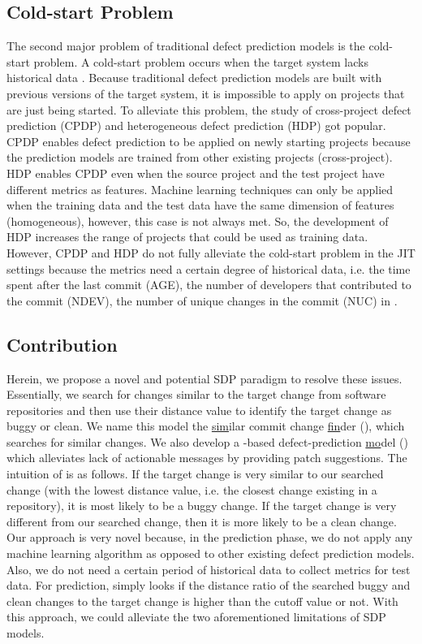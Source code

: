 \subsection{Cold-start Problem}
The second major problem of traditional defect prediction models is the cold-start problem.
A cold-start problem occurs when the target system lacks historical data \cite{schein2002methods}. 
Because traditional defect prediction models are built with previous versions of the target system, it is impossible to apply on projects that are just being started.
To alleviate this problem, the study of cross-project defect prediction (CPDP) and heterogeneous defect prediction (HDP) got popular.
CPDP enables defect prediction to be applied on newly starting projects because the prediction models are trained from other existing projects (cross-project).
HDP enables CPDP even when the source project and the test project have different metrics as features.
Machine learning techniques can only be applied when the training data and the test data have the same dimension of features (homogeneous), however, this case is not always met.
So, the development of HDP increases the range of projects that could be used as training data.
However, CPDP and HDP do not fully alleviate the cold-start problem in the JIT settings because the metrics need a certain degree of historical data, i.e. the time spent after the last commit (AGE), the number of developers that contributed to the commit (NDEV), the number of unique changes in the commit (NUC) in \cite{kamei2012large}.

\subsection{Contribution}
Herein, we propose a novel and potential SDP paradigm to resolve these issues.
Essentially, we search for changes similar to the target change from software repositories and then use their distance value to identify the target change as buggy or clean.
We name this model the \underline{sim}ilar commit change \underline{fin}der ({\simfin}), which searches for similar changes.
We also develop a \underline{\simfin}-based defect-prediction \underline{mo}del ({\simfinmo}) which alleviates lack of actionable messages by providing patch suggestions.
The intuition of {\simfin} is as follows.
If the target change is very similar to our searched change (with the lowest distance value, i.e. the closest change existing in a repository), it is most likely to be a buggy change.
If the target change is very different from our searched change, then it is more likely to be a clean change.
Our approach is very novel because, in the prediction phase, we do not apply any machine learning algorithm as opposed to other existing defect prediction models.
Also, we do not need a certain period of historical data to collect metrics for test data.
For prediction, {\simfinmo} simply looks if the distance ratio of the searched buggy and clean changes to the target change is higher than the cutoff value or not.
With this approach, we could alleviate the two aforementioned limitations of SDP models.

